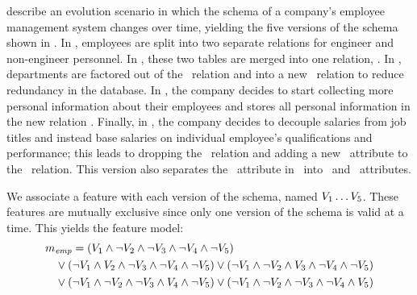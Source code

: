 %

\cite{prima08Moon}  describe an evolution scenario in which the schema of a
company's employee management system changes over time, yielding the five
versions of the schema shown in .
%
In \vOne, employees are split into two separate relations for
engineer and non-engineer personnel.
%
In \vTwo, these two tables are merged into one relation, \empacct.
%
In \vThree, departments are factored out of the \empacct\ relation and
into a new \dept\ relation to reduce redundancy in the database.
%
In \vFour, the company decides to start collecting more personal
information about their employees and stores all personal information in the
new relation \empbio.
%
Finally, in \vFive, the company decides to decouple salaries from
job titles and instead base salaries on individual employee's qualifications
and performance; this leads to dropping the \job\ relation and adding a new
\salary\ attribute to the \empacct\ relation. This version also separates the
\name\ attribute in \empbio\ into \fname\ and \lname\ attributes.


We associate a feature with each version of the schema, named 
$\vOne\ldots\vFive$.
%
These features are mutually exclusive since only one version of the
schema is valid at a time. This yields the  feature model:
%
%
\begin{align*}
\fModel_\employee
  &=   \left(\vOne\wedge\neg\vTwo\wedge\neg\vThree\wedge\neg\vFour\wedge\neg\vFive\right)\\
  &\hspace{-15pt} \vee\left(\neg\vOne\wedge\vTwo\wedge\neg\vThree\wedge\neg\vFour\wedge\neg\vFive\right)
  \vee\left(\neg\vOne\wedge\neg\vTwo\wedge\vThree\wedge\neg\vFour\wedge\neg\vFive\right)\\
   &\hspace{-15pt} \vee\left(\neg\vOne\wedge\neg\vTwo\wedge\neg\vThree\wedge\vFour\wedge\neg\vFive\right)
  \vee\left(\neg\vOne\wedge\neg\vTwo\wedge\neg\vThree\wedge\neg\vFour\wedge\vFive\right)
\end{align*}



